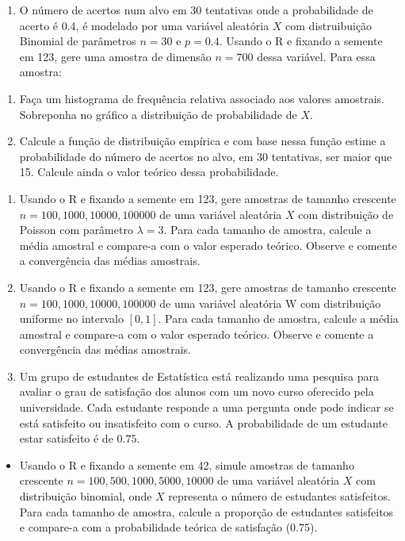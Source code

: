 \documentclass[
]{book}
\providecommand{\tightlist}{%
  \setlength{\itemsep}{0pt}\setlength{\parskip}{0pt}}
\begin{document}
\begin{enumerate}
\def\labelenumi{\arabic{enumi}.}
\setcounter{enumi}{9}
\tightlist
\item
  O número de acertos num alvo em 30 tentativas onde a probabilidade de acerto é 0.4, é modelado por uma variável aleatória \(X\) com distruibuição Binomial de parâmetros \(n=30\) e \(p=0.4\). Usando o R e fixando a semente em 123, gere uma amostra de dimensão \(n=700\) dessa variável. Para essa amostra:
\end{enumerate}

\begin{enumerate}
\def\labelenumi{(\alph{enumi})}
\item
  Faça um histograma de frequência relativa associado aos valores amostrais. Sobreponha no gráfico a distribuição de probabilidade de \(X\).
\item
  Calcule a função de distribuição empírica e com base nessa função estime a probabilidade do número de acertos no alvo, em 30 tentativas, ser maior que 15. Calcule ainda o valor teórico dessa probabilidade.
\end{enumerate}

\begin{enumerate}
\def\labelenumi{\arabic{enumi}.}
\setcounter{enumi}{10}
\item
  Usando o R e fixando a semente em 123, gere amostras de tamanho crescente \(n = 100, 1000, 10000, 100000\) de uma variável aleatória \(X\) com distribuição de Poisson com parâmetro \(\lambda = 3\). Para cada tamanho de amostra, calcule a média amostral e compare-a com o valor esperado teórico. Observe e comente a convergência das médias amostrais.
\item
  Usando o R e fixando a semente em 123, gere amostras de tamanho crescente \(n = 100, 1000, 10000, 100000\) de uma variável aleatória W com distribuição uniforme no intervalo \([0, 1]\). Para cada tamanho de amostra, calcule a média amostral e compare-a com o valor esperado teórico. Observe e comente a convergência das médias amostrais.
\item
  Um grupo de estudantes de Estatística está realizando uma pesquisa para avaliar o grau de satisfação dos alunos com um novo curso oferecido pela universidade. Cada estudante responde a uma pergunta onde pode indicar se está satisfeito ou insatisfeito com o curso. A probabilidade de um estudante estar satisfeito é de \(0.75\).
\end{enumerate}

\begin{itemize}
\tightlist
\item
  Usando o R e fixando a semente em 42, simule amostras de tamanho crescente \(n = 100, 500, 1000, 5000, 10000\) de uma variável aleatória \(X\) com distribuição binomial, onde \(X\) representa o número de estudantes satisfeitos. Para cada tamanho de amostra, calcule a proporção de estudantes satisfeitos e compare-a com a probabilidade teórica de satisfação (0.75).
\end{itemize}
\end{document}
